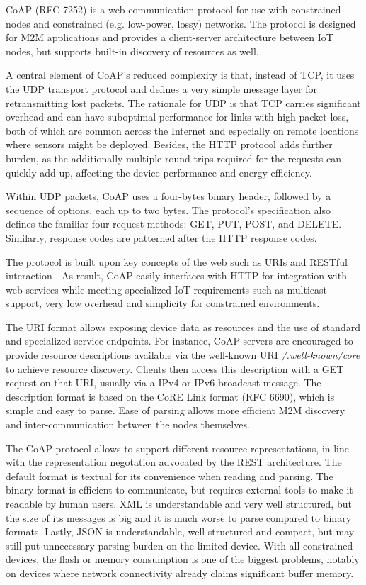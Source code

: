 CoAP \cite{coap} (RFC 7252) is a web communication protocol for use with constrained nodes and constrained (e.g. low-power, lossy) networks. The protocol is designed for M2M applications and provides a client-server architecture between IoT nodes, but supports built-in discovery of resources as well.

A central element of CoAP's reduced complexity is that, instead of TCP, it uses the UDP transport protocol and defines a very simple message layer for retransmitting lost packets. The rationale for UDP is that TCP carries significant overhead and can have suboptimal performance for links with high packet loss, both of which are common across the Internet \cite{akamai} and especially on remote locations where sensors might be deployed. Besides, the HTTP protocol adds further burden, as the additionally multiple round trips required for the requests can quickly add up, affecting the device performance and energy efficiency.

Within UDP packets, CoAP uses a four-bytes binary header, followed by a sequence of options, each up to two bytes. The protocol's specification also defines the familiar four request methods: GET, PUT, POST, and DELETE. Similarly, response codes are patterned after the HTTP response codes.

The protocol is built upon key concepts of the web such as URIs and RESTful interaction \cite{coap-soa}. As result, CoAP easily interfaces with HTTP for integration with web services while meeting specialized IoT requirements such as multicast support, very low overhead and simplicity for constrained environments. 

The URI format allows exposing device data as resources and the use of standard and specialized service endpoints. For instance, CoAP servers are encouraged to provide resource descriptions available via the well-known URI \emph{/.well-known/core} to achieve resource discovery. Clients then access this description with a GET request on that URI, usually via a IPv4 or IPv6 broadcast message. The description format is based on the CoRE Link format (RFC 6690), which is simple and easy to parse. Ease of parsing allows more efficient M2M discovery and inter-communication between the nodes themselves.

The CoAP protocol allows to support different resource representations, in line with the representation negotation advocated by the REST architecture. The default format is textual for its convenience when reading and parsing. The binary format is efficient to communicate, but requires external tools to make it readable by human users. XML is understandable and very well structured, but the size of its messages is big and it is much worse to parse compared to binary formats. Lastly, JSON is understandable, well structured and compact, but may still put unnecessary parsing burden on the limited device. With all constrained devices, the flash or memory consumption is one of the biggest problems, notably on devices where network connectivity already claims significant buffer memory.

